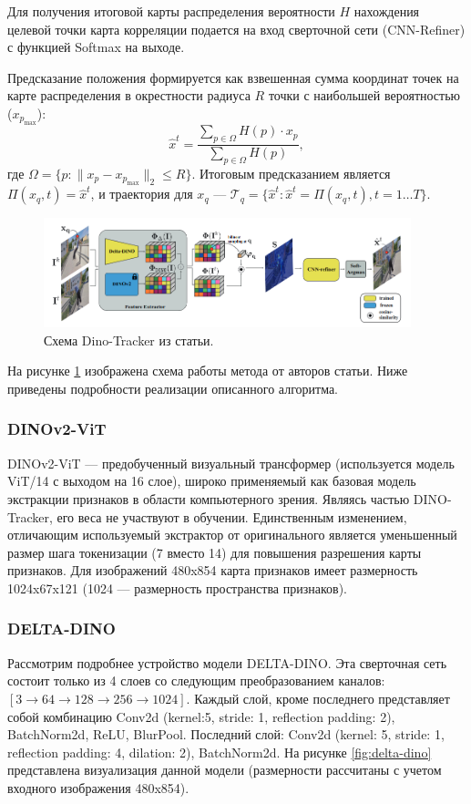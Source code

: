\documentclass[a4paper, 14pt]{extarticle}
\theoremstyle{definition}
\theoremstyle{plain}
\theoremstyle{remark}
\begin{document}
Для получения итоговой карты распределения вероятности $H$ нахождения целевой точки карта корреляции подается на вход сверточной сети (CNN-Refiner) с функцией Softmax на выходе.

Предсказание положения формируется как взвешенная сумма координат точек на карте распределения в окрестности радиуса $R$ точки с наибольшей вероятностью ($x_{p_{\text{max}}}$):
\begin{equation} \label{eq:prediction}
	\hat{{x}}^t = \frac{\sum_{{p} \in \Omega} {H}({p}) \cdot {x}_{{p}}}{\sum_{{p} \in \Omega} {H}({p})},
\end{equation}
где \(\Omega = \{{p} : \|{x}_{{p}} - {x}_{{p}_{\text{max}}}\|_2 \leq R\}\). Итоговым предсказанием является \(\Pi({x}_q, t) = \hat{{x}}^t\), и траектория для \({x}_q\) --- \(\mathcal{T}_q = \{\hat{{x}}^t : \hat{{x}}^t = \Pi({x}_q, t), t = 1 \dots T\}\).
\begin{figure}
    [H]
    \centering
    \includegraphics[width=0.95\textwidth]{figs/demo.png}
    \caption{Схема Dino-Tracker из статьи.}
    \label{fig:tracker-scheme}
\end{figure}

На рисунке \ref{fig:tracker-scheme} изображена схема работы метода от авторов статьи. Ниже приведены подробности реализации описанного алгоритма.
\subsubsection{DINOv2-ViT}
DINOv2-ViT --- предобученный визуальный трансформер (используется модель ViT/14 с выходом на 16 слое), широко применяемый как базовая модель экстракции признаков в области компьютерного зрения.
Являясь частью DINO-Tracker, его веса не участвуют в обучении. Единственным изменением, отличающим используемый экстрактор от оригинального является уменьшенный размер шага токенизации (7 вместо 14) для повышения разрешения карты признаков.
Для изображений 480x854 карта признаков имеет размерность 1024x67x121 (1024 --- размерность пространства признаков).
\subsubsection{DELTA-DINO}
Рассмотрим подробнее устройство модели DELTA-DINO. 
Эта сверточная сеть состоит только из 4 слоев со следующим преобразованием каналов: $[3 \to 64 \to 128 \to 256 \to 1024]$. 
Каждый слой, кроме последнего представляет собой комбинацию Conv2d (kernel:5, stride: 1, reflection padding: 2), BatchNorm2d, ReLU, BlurPool. 
Последний слой: Conv2d (kernel: 5, stride: 1, reflection padding: 4, dilation: 2), BatchNorm2d. 
На рисунке \ref{fig:delta-dino} представлена визуализация данной модели (размерности рассчитаны с учетом входного изображения 480x854).
\end{document}
